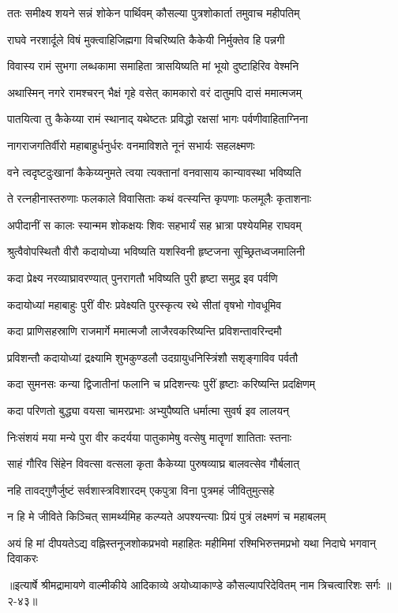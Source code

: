 
\twolineshloka
{ततः समीक्ष्य शयने सन्नं शोकेन पार्थिवम्}
{कौसल्या पुत्रशोकार्ता तमुवाच महीपतिम्} %

\twolineshloka
{राघवे नरशार्दूले विषं मुक्त्वाहिजिह्मगा}
{विचरिष्यति कैकेयी निर्मुक्तेव हि पन्नगी} %

\twolineshloka
{विवास्य रामं सुभगा लब्धकामा समाहिता}
{त्रासयिष्यति मां भूयो दुष्टाहिरिव वेश्मनि} %

\twolineshloka
{अथास्मिन् नगरे रामश्चरन् भैक्षं गृहे वसेत्}
{कामकारो वरं दातुमपि दासं ममात्मजम्} %

\twolineshloka
{पातयित्वा तु कैकेय्या रामं स्थानाद् यथेष्टतः}
{प्रविद्धो रक्षसां भागः पर्वणीवाहिताग्निना} %

\twolineshloka
{नागराजगतिर्वीरो महाबाहुर्धनुर्धरः}
{वनमाविशते नूनं सभार्यः सहलक्ष्मणः} %

\twolineshloka
{वने त्वदृष्टदुःखानां कैकेय्यनुमते त्वया}
{त्यक्तानां वनवासाय कान्यावस्था भविष्यति} %

\twolineshloka
{ते रत्नहीनास्तरुणाः फलकाले विवासिताः}
{कथं वत्स्यन्ति कृपणाः फलमूलैः कृताशनाः} %

\twolineshloka
{अपीदानीं स कालः स्यान्मम शोकक्षयः शिवः}
{सहभार्यं सह भ्रात्रा पश्येयमिह राघवम्} %

\twolineshloka
{श्रुत्वैवोपस्थितौ वीरौ कदायोध्या भविष्यति}
{यशस्विनी हृष्टजना सूच्छ्रितध्वजमालिनी} %

\twolineshloka
{कदा प्रेक्ष्य नरव्याघ्रावरण्यात् पुनरागतौ}
{भविष्यति पुरी हृष्टा समुद्र इव पर्वणि} %

\twolineshloka
{कदायोध्यां महाबाहुः पुरीं वीरः प्रवेक्ष्यति}
{पुरस्कृत्य रथे सीतां वृषभो गोवधूमिव} %

\twolineshloka
{कदा प्राणिसहस्राणि राजमार्गे ममात्मजौ}
{लाजैरवकरिष्यन्ति प्रविशन्तावरिन्दमौ} %

\twolineshloka
{प्रविशन्तौ कदायोध्यां द्रक्ष्यामि शुभकुण्डलौ}
{उदग्रायुधनिस्त्रिंशौ सशृङ्गाविव पर्वतौ} %

\twolineshloka
{कदा सुमनसः कन्या द्विजातीनां फलानि च}
{प्रदिशन्त्यः पुरीं हृष्टाः करिष्यन्ति प्रदक्षिणम्} %

\twolineshloka
{कदा परिणतो बुद्ध्या वयसा चामरप्रभाः}
{अभ्युपैष्यति धर्मात्मा सुवर्ष इव लालयन्} %

\twolineshloka
{निःसंशयं मया मन्ये पुरा वीर कदर्यया}
{पातुकामेषु वत्सेषु मातॄणां शातिताः स्तनाः} %

\twolineshloka
{साहं गौरिव सिंहेन विवत्सा वत्सला कृता}
{कैकेय्या पुरुषव्याघ्र बालवत्सेव गौर्बलात्} %

\twolineshloka
{नहि तावद्गुणैर्जुष्टं सर्वशास्त्रविशारदम्}
{एकपुत्रा विना पुत्रमहं जीवितुमुत्सहे} %

\twolineshloka
{न हि मे जीविते किञ्चित् सामर्थ्यमिह कल्प्यते}
{अपश्यन्त्याः प्रियं पुत्रं लक्ष्मणं च महाबलम्} %

\twolineshloka
{अयं हि मां दीपयतेऽद्य वह्निस्तनूजशोकप्रभवो महाहितः}
{महीमिमां रश्मिभिरुत्तमप्रभो यथा निदाघे भगवान् दिवाकरः} %


॥इत्यार्षे श्रीमद्रामायणे वाल्मीकीये आदिकाव्ये अयोध्याकाण्डे कौसल्यापरिदेवितम् नाम त्रिचत्वारिशः सर्गः ॥२-४३॥

